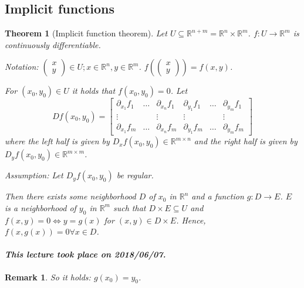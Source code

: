 \documentclass{article}
\newtheorem{theorem}{Theorem}  \numberwithin{theorem}{section}
\newtheorem{remark}{Remark}  \numberwithin{remark}{section}
\newcommand{\dateref}[1]{\paragraph{\textit{This lecture took place on #1.}}}
\newcommand{\vectwo}[2]{\begin{pmatrix} #1 \\ #2 \end{pmatrix}}
\begin{document}
\subsection{Implicit functions}
\begin{theorem}[Implicit function theorem] %
  Let $U \subseteq \mathbb R^{n + m} = \mathbb R^n \times \mathbb R^m$.
  $f: U \to \mathbb R^m$ is continuously differentiable.

  \emph{Notation:} $\vectwo xy \in U; x \in \mathbb R^n, y \in \mathbb R^m$. $f\left(\vectwo xy\right) = f(x, y)$.
  
  For $(x_0, y_0) \in U$ it holds that $f(x_0, y_0) = 0$.
  Let
  \[
    Df(x_0, y_0) = \begin{bmatrix}
      \partial_{x_1} f_1 & \dots & \partial_{x_n} f_1 & \partial_{y_1} f_1 & \dots & \partial_{y_m} f_1 \\
      \vdots & & \vdots & \vdots & & \vdots \\
      \partial_{x_1} f_m & \dots & \partial_{x_n} f_m & \partial_{y_1} f_m & \dots & \partial_{y_m} f_m
    \end{bmatrix}
  \]
  where the left half is given by $D_x f(x_0, y_0) \in \mathbb R^{m \times n}$ and the right half is given by $D_y f(x_0, y_0) \in \mathbb R^{m \times m}$.
  
  Assumption: Let $D_y f(x_0, y_0)$ be regular.
  
  Then there exists some neighborhood $D$ of $x_0$ in $\mathbb R^n$ and a function $g: D \to E$.
  $E$ is a neighborhood of $y_0$ in $\mathbb R^m$ such that $D \times E \subseteq U$ and $f(x,y) = 0 \iff y = g(x)$ for $(x, y) \in D \times E$.
  Hence, $f(x, g(x)) = 0 \forall x \in D$.
\end{theorem}

\dateref{2018/06/07}

\begin{remark}
  So it holds: $g(x_0) = y_0$.
\end{remark}
\end{document}
